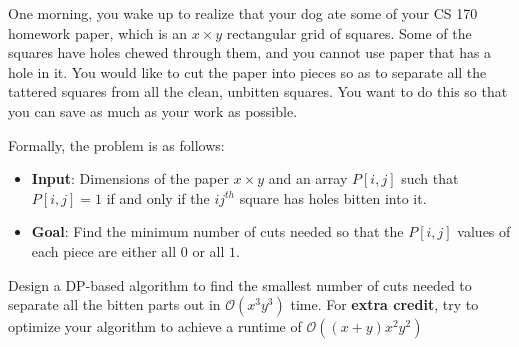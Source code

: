 \documentclass{article}
\begin{document}
One morning, you wake up to realize that your dog ate some of your CS 170 homework paper, which is an $x \times y$ rectangular grid of squares. Some of the squares have holes chewed through them, and you cannot use paper that has a hole in it. You would like to cut the paper into pieces so as to separate all the tattered squares from all the clean, unbitten squares. You want to do this so that you can save as much as your work as possible.

Formally, the problem is as follows:
    \begin{itemize}
        \item \textbf{Input}: Dimensions of the paper $x \times y$ and an array $P[i, j]$ such that $P[i, j] = 1$ if and only if the $ij^{th}$ square has holes bitten into it.

        \item \textbf{Goal}: Find the minimum number of cuts needed so that the $P[i, j]$ values of each piece are either all $0$ or all $1$.
    \end{itemize}
Design a DP-based algorithm to find the smallest number of cuts needed to separate all the bitten parts out in $\mathcal{O}(x^{3}y^{3})$ time. For \textbf{extra credit}, try to optimize your algorithm to achieve a runtime of $\mathcal{O}((x + y)x^{2} y^{2})$
\end{document}
